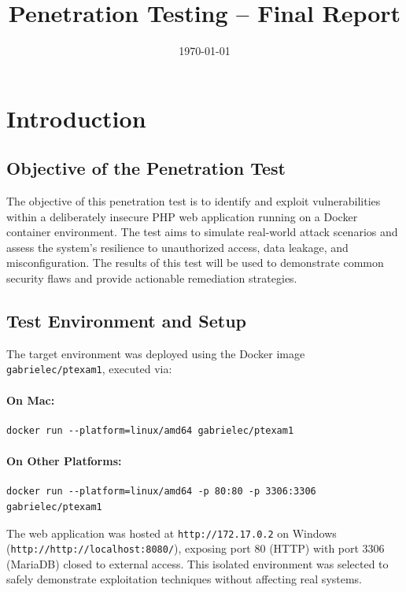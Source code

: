 \documentclass[12pt]{article}
\title{Penetration Testing – Final Report}
\author{}
\date{\today}
\begin{document}
\maketitle
\thispagestyle{empty}
\newpage

\tableofcontents
\newpage

\section{Introduction}

\subsection{Objective of the Penetration Test}
The objective of this penetration test is to identify and exploit vulnerabilities within a deliberately insecure PHP web application running on a Docker container environment. The test aims to simulate real-world attack scenarios and assess the system's resilience to unauthorized access, data leakage, and misconfiguration. The results of this test will be used to demonstrate common security flaws and provide actionable remediation strategies.

\subsection{Test Environment and Setup}
The target environment was deployed using the Docker image \texttt{gabrielec/ptexam1}, executed via:

\paragraph{On Mac:}
\begin{verbatim}
docker run --platform=linux/amd64 gabrielec/ptexam1
\end{verbatim}

\paragraph{On Other Platforms:}
\begin{verbatim}
docker run --platform=linux/amd64 -p 80:80 -p 3306:3306 gabrielec/ptexam1
\end{verbatim}
The web application was hosted at \texttt{http://172.17.0.2} on Windows (\texttt{http://http://localhost:8080/}), exposing port 80 (HTTP) with port 3306 (MariaDB) closed to external access. This isolated environment was selected to safely demonstrate exploitation techniques without affecting real systems.
\end{document}
